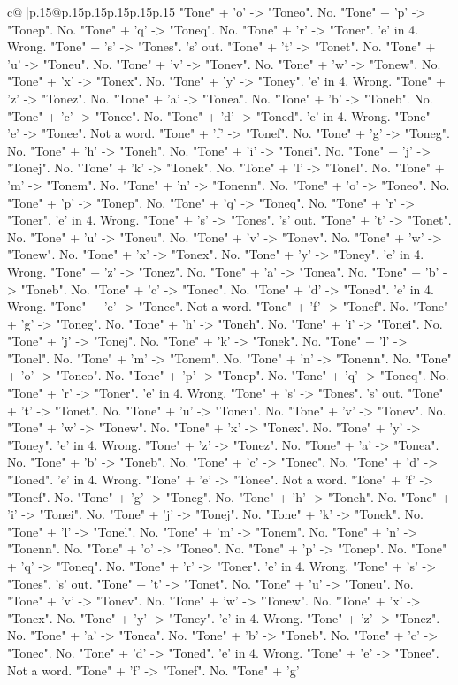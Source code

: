 \documentclass{article}
\begin{document}
{\begin{supertabular}{c@{$\;$}|p{.15\linewidth}@{}p{.15\linewidth}p{.15\linewidth}p{.15\linewidth}p{.15\linewidth}p{.15\linewidth}}
{{{"Tone" + 'o' {-}> "Toneo". No. "Tone" + 'p' {-}> "Tonep". No. "Tone" + 'q' {-}> "Toneq". No. "Tone" + 'r' {-}> "Toner". 'e' in 4. Wrong. "Tone" + 's' {-}> "Tones". 's' out. "Tone" + 't' {-}> "Tonet". No. "Tone" + 'u' {-}> "Toneu". No. "Tone" + 'v' {-}> "Tonev". No. "Tone" + 'w' {-}> "Tonew". No. "Tone" + 'x' {-}> "Tonex". No. "Tone" + 'y' {-}> "Toney". 'e' in 4. Wrong. "Tone" + 'z' {-}> "Tonez". No. "Tone" + 'a' {-}> "Tonea". No. "Tone" + 'b' {-}> "Toneb". No. "Tone" + 'c' {-}> "Tonec". No. "Tone" + 'd' {-}> "Toned". 'e' in 4. Wrong. "Tone" + 'e' {-}> "Tonee". Not a word. "Tone" + 'f' {-}> "Tonef". No. "Tone" + 'g' {-}> "Toneg". No. "Tone" + 'h' {-}> "Toneh". No. "Tone" + 'i' {-}> "Tonei". No. "Tone" + 'j' {-}> "Tonej". No. "Tone" + 'k' {-}> "Tonek". No. "Tone" + 'l' {-}> "Tonel". No. "Tone" + 'm' {-}> "Tonem". No. "Tone" + 'n' {-}> "Tonenn". No. "Tone" + 'o' {-}> "Toneo". No. "Tone" + 'p' {-}> "Tonep". No. "Tone" + 'q' {-}> "Toneq". No. "Tone" + 'r' {-}> "Toner". 'e' in 4. Wrong. "Tone" + 's' {-}> "Tones". 's' out. "Tone" + 't' {-}> "Tonet". No. "Tone" + 'u' {-}> "Toneu". No. "Tone" + 'v' {-}> "Tonev". No. "Tone" + 'w' {-}> "Tonew". No. "Tone" + 'x' {-}> "Tonex". No. "Tone" + 'y' {-}> "Toney". 'e' in 4. Wrong. "Tone" + 'z' {-}> "Tonez". No. "Tone" + 'a' {-}> "Tonea". No. "Tone" + 'b' {-}> "Toneb". No. "Tone" + 'c' {-}> "Tonec". No. "Tone" + 'd' {-}> "Toned". 'e' in 4. Wrong. "Tone" + 'e' {-}> "Tonee". Not a word. "Tone" + 'f' {-}> "Tonef". No. "Tone" + 'g' {-}> "Toneg". No. "Tone" + 'h' {-}> "Toneh". No. "Tone" + 'i' {-}> "Tonei". No. "Tone" + 'j' {-}> "Tonej". No. "Tone" + 'k' {-}> "Tonek". No. "Tone" + 'l' {-}> "Tonel". No. "Tone" + 'm' {-}> "Tonem". No. "Tone" + 'n' {-}> "Tonenn". No. "Tone" + 'o' {-}> "Toneo". No. "Tone" + 'p' {-}> "Tonep". No. "Tone" + 'q' {-}> "Toneq". No. "Tone" + 'r' {-}> "Toner". 'e' in 4. Wrong. "Tone" + 's' {-}> "Tones". 's' out. "Tone" + 't' {-}> "Tonet". No. "Tone" + 'u' {-}> "Toneu". No. "Tone" + 'v' {-}> "Tonev". No. "Tone" + 'w' {-}> "Tonew". No. "Tone" + 'x' {-}> "Tonex". No. "Tone" + 'y' {-}> "Toney". 'e' in 4. Wrong. "Tone" + 'z' {-}> "Tonez". No. "Tone" + 'a' {-}> "Tonea". No. "Tone" + 'b' {-}> "Toneb". No. "Tone" + 'c' {-}> "Tonec". No. "Tone" + 'd' {-}> "Toned". 'e' in 4. Wrong. "Tone" + 'e' {-}> "Tonee". Not a word. "Tone" + 'f' {-}> "Tonef". No. "Tone" + 'g' {-}> "Toneg". No. "Tone" + 'h' {-}> "Toneh". No. "Tone" + 'i' {-}> "Tonei". No. "Tone" + 'j' {-}> "Tonej". No. "Tone" + 'k' {-}> "Tonek". No. "Tone" + 'l' {-}> "Tonel". No. "Tone" + 'm' {-}> "Tonem". No. "Tone" + 'n' {-}> "Tonenn". No. "Tone" + 'o' {-}> "Toneo". No. "Tone" + 'p' {-}> "Tonep". No. "Tone" + 'q' {-}> "Toneq". No. "Tone" + 'r' {-}> "Toner". 'e' in 4. Wrong. "Tone" + 's' {-}> "Tones". 's' out. "Tone" + 't' {-}> "Tonet". No. "Tone" + 'u' {-}> "Toneu". No. "Tone" + 'v' {-}> "Tonev". No. "Tone" + 'w' {-}> "Tonew". No. "Tone" + 'x' {-}> "Tonex". No. "Tone" + 'y' {-}> "Toney". 'e' in 4. Wrong. "Tone" + 'z' {-}> "Tonez". No. "Tone" + 'a' {-}> "Tonea". No. "Tone" + 'b' {-}> "Toneb". No. "Tone" + 'c' {-}> "Tonec". No. "Tone" + 'd' {-}> "Toned". 'e' in 4. Wrong. "Tone" + 'e' {-}> "Tonee". Not a word. "Tone" + 'f' {-}> "Tonef". No. "Tone" + 'g' }}}
\end{supertabular}}
\end{document}
